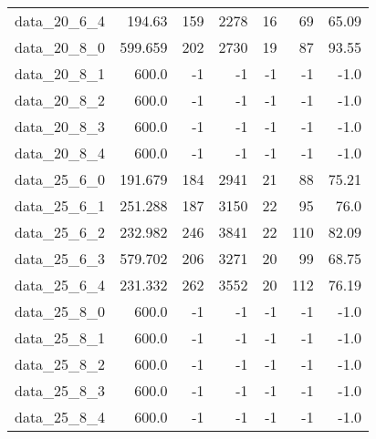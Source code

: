 \begin{tabular}{rrrrrrr}
  data\_20\_6\_4 & 194.63 & 159 & 2278 & 16 & 69 & 65.09 \\
  data\_20\_8\_0 & 599.659 & 202 & 2730 & 19 & 87 & 93.55 \\
  data\_20\_8\_1 & 600.0 & -1 & -1 & -1 & -1 & -1.0 \\
  data\_20\_8\_2 & 600.0 & -1 & -1 & -1 & -1 & -1.0 \\
  data\_20\_8\_3 & 600.0 & -1 & -1 & -1 & -1 & -1.0 \\
  data\_20\_8\_4 & 600.0 & -1 & -1 & -1 & -1 & -1.0 \\
  data\_25\_6\_0 & 191.679 & 184 & 2941 & 21 & 88 & 75.21 \\
  data\_25\_6\_1 & 251.288 & 187 & 3150 & 22 & 95 & 76.0 \\
  data\_25\_6\_2 & 232.982 & 246 & 3841 & 22 & 110 & 82.09 \\
  data\_25\_6\_3 & 579.702 & 206 & 3271 & 20 & 99 & 68.75 \\
  data\_25\_6\_4 & 231.332 & 262 & 3552 & 20 & 112 & 76.19 \\
  data\_25\_8\_0 & 600.0 & -1 & -1 & -1 & -1 & -1.0 \\
  data\_25\_8\_1 & 600.0 & -1 & -1 & -1 & -1 & -1.0 \\
  data\_25\_8\_2 & 600.0 & -1 & -1 & -1 & -1 & -1.0 \\
  data\_25\_8\_3 & 600.0 & -1 & -1 & -1 & -1 & -1.0 \\
  data\_25\_8\_4 & 600.0 & -1 & -1 & -1 & -1 & -1.0 \\\hline
\end{tabular}
